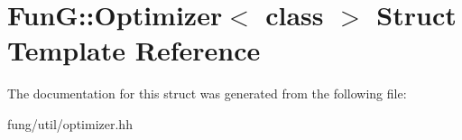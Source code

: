 \hypertarget{structFunG_1_1Optimizer}{\section{Fun\-G\-:\-:Optimizer$<$ class $>$ Struct Template Reference}
\label{structFunG_1_1Optimizer}
}


The documentation for this struct was generated from the following file\-:\begin{DoxyCompactItemize}
\item 
fung/util/optimizer.\-hh\end{DoxyCompactItemize}
